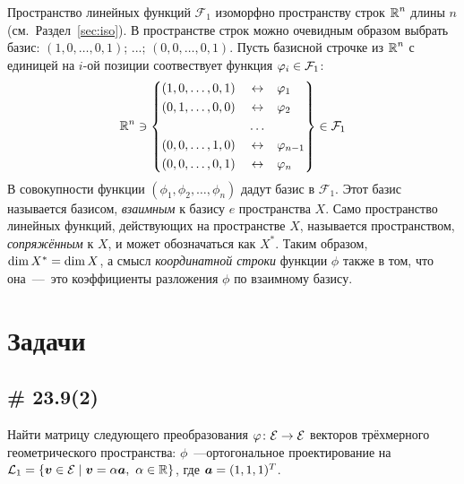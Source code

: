 \documentclass[a4paper,12pt]{article}
\begin{document}
  Пространство линейных функций $\mathcal F_1$ изоморфно пространству строк $\operatorname{\mathbb R}^n$ длины $n$ (см.~Раздел~\ref{sec:iso}).
  В пространстве строк можно очевидным образом выбрать базис: $(1, 0, \ldots, 0, 1)$; ...; $(0, 0, \ldots, 0, 1)$.
  Пусть базисной строчке из $\operatorname{\mathbb R}^n$ с единицей на $i$-ой позиции соотвествует функция $\phi_i \hm\in \mathcal F_1$:
  \[
    \RR^n \ni \left\{
      \begin{aligned}
        &(1, 0, \ldots, 0, 1)            & &\leftrightarrow & &\phi_{1\hphantom{-1}}\\
        &(0, 1, \ldots, 0, 0)            & &\leftrightarrow & &\phi_{2\hphantom{-1}}\\
        &\hphantom{(0, 1, \ldots, 0, 0)} & &\ldots  & &\hphantom{\phi_{2\hphantom{-1}}}\\
        &(0, 0, \ldots, 1, 0)            & &\leftrightarrow & &\phi_{n-1}\\
        &(0, 0, \ldots, 0, 1)            & &\leftrightarrow & &\phi_{n\hphantom{-1}}
      \end{aligned}
    \right\} \in \mathcal F_1
  \]
  В совокупности функции $(\phi_1, \phi_2, \ldots, \phi_n)$ дадут базис в $\mathcal F_1$.
  Этот базис называется базисом, \emph{взаимным} к базису $e$ пространства $X$.
  Само пространство линейных функций, действующих на пространстве $X$, называется пространством, \emph{сопряжённым} к $X$, и может обозначаться как $X^{*}$.
  Таким образом, $\dim X^{*} \hm= \dim X$, а смысл \emph{координатной строки} функции $\phi$ также в том, что она~---~это коэффициенты разложения $\phi$ по взаимному базису.
  
  
  
  \section{Задачи}
  
  
  \subsection{\# 23.9(2)}
  
  Найти матрицу следующего преобразования $\phi \colon \mathcal E \hm\to \mathcal E$ векторов трёхмерного геометрического пространства:
  $\phi$~---ортогональное проектирование на $\mathcal L_1 \hm= \{\bds v \hm\in \mathcal E \hm\mid \bds v \hm= \alpha \bds a,\ \alpha \hm\in \RR\}$, где $\bds a \hm= (1, 1, 1)^T$.
  
\end{document}
